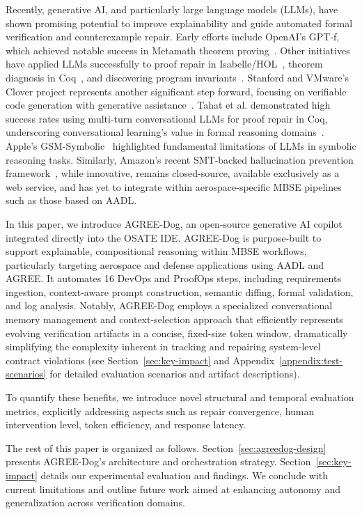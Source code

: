Recently, generative AI, and particularly large language models (LLMs), have shown promising potential to improve explainability and guide automated formal verification and counterexample repair. Early efforts include OpenAI’s GPT-f, which achieved notable success in Metamath theorem proving~\cite{polu2020generative, megill2019metamath}. Other initiatives have applied LLMs successfully to proof repair in Isabelle/HOL~\cite{first2023baldur}, theorem diagnosis in Coq~\cite{zhang2023getting}, and discovering program invariants~\cite{pei2023can, wu2023lemur}. Stanford and VMware’s Clover project represents another significant step forward, focusing on verifiable code generation with generative assistance~\cite{sun2024clover}. Tahat et al. demonstrated high success rates using multi-turn conversational LLMs for proof repair in Coq, underscoring conversational learning’s value in formal reasoning domains~\cite{CoqDog, CoqDogHCSS24}.
%
Apple's GSM-Symbolic~\cite{mirzadeh2025gsmsymbolic} highlighted fundamental limitations of LLMs in symbolic reasoning tasks. Similarly, Amazon’s recent SMT-backed hallucination prevention framework~\cite{amazon2024mathematical}, while innovative, remains closed-source, available exclusively as a web service, and has yet to integrate within aerospace-specific MBSE pipelines such as those based on AADL.

In this paper, we introduce AGREE-Dog, an open-source generative AI copilot integrated directly into the OSATE IDE. AGREE-Dog is purpose-built to support explainable, compositional reasoning within MBSE workflows, particularly targeting aerospace and defense applications using AADL and AGREE. It automates 16 DevOps and ProofOps steps, including requirements ingestion, context-aware prompt construction, semantic diffing, formal validation, and log analysis. Notably, AGREE-Dog employs a specialized conversational memory management and context-selection approach that efficiently represents evolving verification artifacts in a concise, fixed-size token window, dramatically simplifying the complexity inherent in tracking and repairing system-level contract violations (see Section~\ref{sec:key-impact} and Appendix~\ref{appendix:test-scenarios} for detailed evaluation scenarios and artifact descriptions).

To quantify these benefits, we introduce novel structural and temporal evaluation metrics, explicitly addressing aspects such as repair convergence, human intervention level, token efficiency, and response latency.

The rest of this paper is organized as follows. 
Section~\ref{sec:agreedog-design} presents AGREE-Dog’s architecture and orchestration strategy. Section~\ref{sec:key-impact} details our experimental evaluation and findings. We conclude with current limitations and outline future work aimed at enhancing autonomy and generalization across verification domains.


